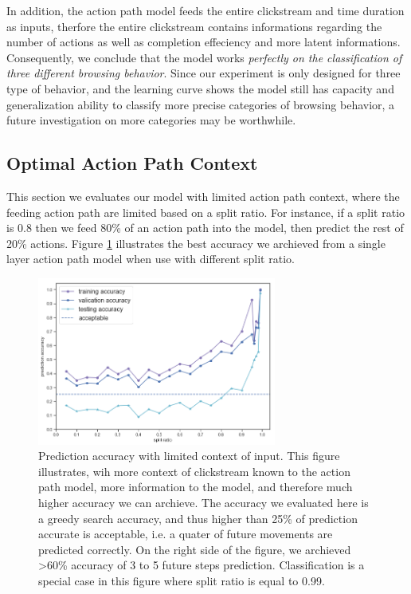 In addition, the action path model feeds the entire clickstream and time duration as inputs, 
therfore the entire clickstream contains informations regarding the number of actions
as well as completion effeciency and more latent informations. 
Consequently, we conclude that the model works
\emph{perfectly on the classification of three different browsing behavior}. 
Since our experiment is only designed for three type of behavior, and the learning curve
shows the model still has capacity and generalization ability to 
classify more precise categories of browsing behavior, a future investigation on
more categories may be worthwhile.

\subsection{Optimal Action Path Context}

This section we evaluates our model with limited action path context, where the feeding action path
are limited based on a split ratio. 
For instance, if a split ratio is 0.8 then we feed 80\% of an action path into the model, 
then predict the rest of 20\% actions. Figure \ref{fig:acc} illustrates the best accuracy 
we archieved from a single layer action path model when use with different split ratio.

\begin{figure}[H]
    \centering
    \includegraphics[width=0.7\textwidth]{figures/acc}
    \caption{Prediction accuracy with limited context of input. This figure illustrates, wih more context of clickstream
    known to the action path model, more information to the model, and therefore much higher accuracy we can archieve.
    The accuracy we evaluated here is a greedy search accuracy, and thus higher than 25\% of prediction accurate is acceptable,
    i.e. a quater of future movements are predicted correctly.
    On the right side of the figure, we archieved >60\% accuracy of 3 to 5 future steps prediction.
    Classification is a special case in this figure where split ratio is equal to 0.99.}
    \label{fig:acc}
\end{figure}

